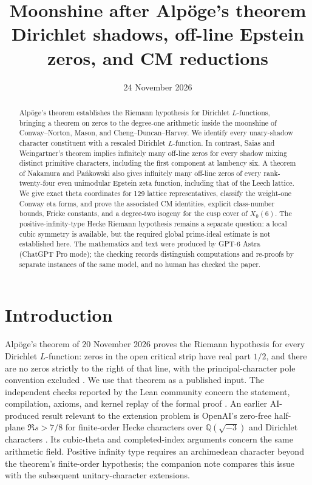\documentclass[11pt]{amsart}
\title[Moonshine after Alp\"oge's theorem]{Moonshine after Alp\"oge's theorem\\
\large Dirichlet shadows, off-line Epstein zeros, and CM reductions}
\author{}
\date{24 November 2026}
\theoremstyle{definition}
\theoremstyle{remark}
\newcommand{\Q}{\mathbb Q}
\begin{document}
\begin{abstract}
Alp\"oge's theorem establishes the Riemann hypothesis for Dirichlet
$L$-functions, bringing a theorem on zeros to the degree-one arithmetic
inside the moonshine of Conway--Norton, Mason, and Cheng--Duncan--Harvey.
We identify every unary-shadow character constituent with a rescaled
Dirichlet $L$-function. In contrast, Saias and Weingartner's theorem implies
infinitely many off-line zeros for every shadow mixing distinct primitive
characters, including the first component at lambency six. A theorem of
Nakamura and Pa\'nkowski also gives infinitely many off-line zeros of
every rank-twenty-four even unimodular Epstein zeta function, including
that of the Leech lattice.
We give exact theta coordinates for 129 lattice representatives, classify
the weight-one Conway eta forms, and prove the associated CM identities,
explicit class-number bounds, Fricke constants, and a degree-two isogeny
for the cusp cover of $X_0(6)$. The positive-infinity-type Hecke Riemann
hypothesis remains a separate question: a local cubic symmetry is available,
but the required global prime-ideal estimate is not established here.
The mathematics and text were produced by GPT-6 Astra (ChatGPT Pro mode);
the checking records distinguish computations and re-proofs by separate
instances of the same model, and no human has checked the paper.
\end{abstract}
\maketitle

\section{Introduction}
Alp\"oge's theorem of 20 November 2026 proves the Riemann hypothesis for
every Dirichlet $L$-function: zeros in the open critical strip have
real part $1/2$, and there are no zeros strictly to the right of that
line, with the principal-character pole convention excluded
\cite{AlpogeLean}.
We use that theorem as a published input. The independent checks reported
by the Lean community concern the statement, compilation, axioms, and
kernel replay of the formal proof \cite{LeanVerification}.
An earlier AI-produced result relevant to the extension problem is
OpenAI's zero-free half-plane $\Re s>7/8$ for finite-order Hecke
characters over $\Q(\sqrt{-3})$ and Dirichlet characters
\cite[Theorem~1.1, p.~4]{OpenAIQRH}. Its cubic-theta and completed-index
arguments concern the same arithmetic field. Positive infinity type
requires an archimedean character beyond the theorem's finite-order
hypothesis; the companion note compares this issue with the subsequent
unitary-character extensions.
\end{document}
